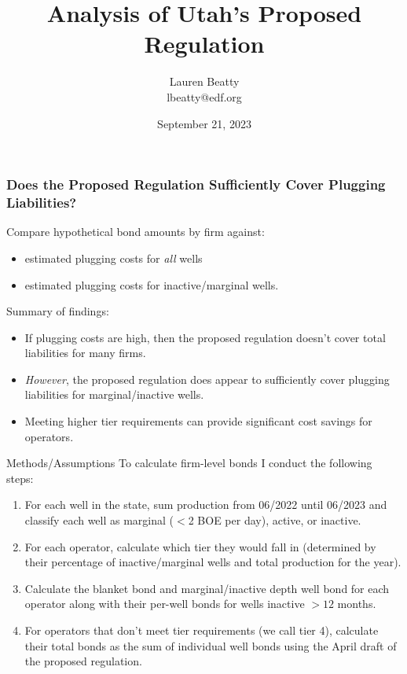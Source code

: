 \documentclass{beamer}
\title{Analysis of Utah's Proposed Regulation}
\author{Lauren Beatty\\ lbeatty@edf.org}
\institute{Environmental Defense Fund}
\date{September 21, 2023}
\begin{document}
\frame{\titlepage}

\begin{frame}
\frametitle{Does the Proposed Regulation Sufficiently Cover Plugging Liabilities?}
    Compare hypothetical bond amounts by firm against:
    \begin{itemize}
        \item estimated plugging costs for \textit{all} wells
        \item estimated plugging costs for inactive/marginal wells.
    \end{itemize}
    Summary of findings:
    \begin{itemize}
        \item If plugging costs are high, then the proposed regulation doesn't cover total liabilities for many firms.
        \item \textit{However}, the proposed regulation does appear to sufficiently cover plugging liabilities for marginal/inactive wells.
        \item Meeting higher tier requirements can provide significant cost savings for operators.
    \end{itemize}
\end{frame}

\begin{frame}{Methods/Assumptions}
\label{BondCalc}
\vspace{-0.2cm}
To calculate firm-level bonds I conduct the following steps:
\begin{enumerate}
    \item For each well in the state, sum production from 06/2022 until 06/2023 and classify each well as marginal ($<$2 BOE per day), active, or inactive.
    \item For each operator, calculate which tier they would fall in (determined by their percentage of inactive/marginal wells and total production for the year).
    \item Calculate the blanket bond and marginal/inactive depth well bond for each operator along with their per-well bonds for wells inactive $>12$ months.
    \item For operators that don't meet tier requirements (we call tier 4), calculate their total bonds as the sum of individual well bonds using the April draft of the proposed regulation.
\end{enumerate}
\hyperlink{bondingnumbers}{}
\end{frame}
\end{document}
